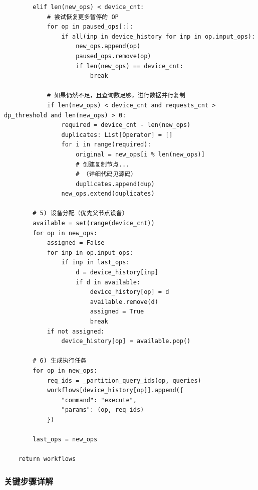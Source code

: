 \documentclass[12pt,a4paper]{article}
\begin{document}
\begin{lstlisting}
        elif len(new_ops) < device_cnt:
            # 尝试恢复更多暂停的 OP
            for op in paused_ops[:]:
                if all(inp in device_history for inp in op.input_ops):
                    new_ops.append(op)
                    paused_ops.remove(op)
                    if len(new_ops) == device_cnt:
                        break
            
            # 如果仍然不足，且查询数足够，进行数据并行复制
            if len(new_ops) < device_cnt and requests_cnt > dp_threshold and len(new_ops) > 0:
                required = device_cnt - len(new_ops)
                duplicates: List[Operator] = []
                for i in range(required):
                    original = new_ops[i % len(new_ops)]
                    # 创建复制节点...
                    # （详细代码见源码）
                    duplicates.append(dup)
                new_ops.extend(duplicates)
        
        # 5) 设备分配（优先父节点设备）
        available = set(range(device_cnt))
        for op in new_ops:
            assigned = False
            for inp in op.input_ops:
                if inp in last_ops:
                    d = device_history[inp]
                    if d in available:
                        device_history[op] = d
                        available.remove(d)
                        assigned = True
                        break
            if not assigned:
                device_history[op] = available.pop()
        
        # 6) 生成执行任务
        for op in new_ops:
            req_ids = _partition_query_ids(op, queries)
            workflows[device_history[op]].append({
                "command": "execute",
                "params": (op, req_ids)
            })
        
        last_ops = new_ops
    
    return workflows
\end{lstlisting}

\subsubsection{关键步骤详解}
\end{document}
